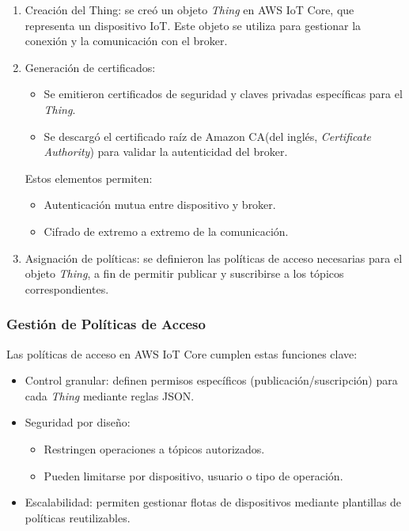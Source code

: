 \begin{enumerate}
    \item Creación del Thing: se creó un objeto \textit{Thing} en AWS IoT Core, que
          representa un dispositivo IoT. Este objeto se utiliza para gestionar la
          conexión y la comunicación con el broker.

    \item Generación de certificados:
          \begin{itemize}
              \item Se emitieron certificados de seguridad y claves privadas específicas para el
                    \textit{Thing}.
              \item Se descargó el certificado raíz de Amazon CA(del inglés, \textit{Certificate
                        Authority}) para validar la autenticidad del broker.
          \end{itemize}
          Estos elementos permiten:
          \begin{itemize}
              \item Autenticación mutua entre dispositivo y broker.
              \item Cifrado de extremo a extremo de la comunicación.
          \end{itemize}

    \item Asignación de políticas: se definieron las políticas de acceso necesarias para
          el objeto \textit{Thing}, a fin de permitir publicar y suscribirse a los
          tópicos correspondientes.
\end{enumerate}

\subsubsection{Gestión de Políticas de Acceso}

Las políticas de acceso en AWS IoT Core cumplen estas funciones clave:

\begin{itemize}
    \item Control granular: definen permisos específicos (publicación/suscripción) para
          cada \textit{Thing} mediante reglas JSON.

    \item Seguridad por diseño:
          \begin{itemize}
              \item Restringen operaciones a tópicos autorizados.
              \item Pueden limitarse por dispositivo, usuario o tipo de operación.
          \end{itemize}

    \item Escalabilidad: permiten gestionar flotas de dispositivos mediante plantillas de
          políticas reutilizables.
\end{itemize}

